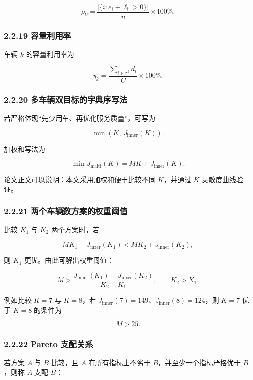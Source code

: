 \documentclass[
  a4paper,
]{ctexart}
\begin{document}
\[
\rho_V=\frac{|\{i:e_i+\ell_i>0\}|}{n}\times 100\%.
\]

\subsubsection{2.2.19 容量利用率}\label{ux5bb9ux91cfux5229ux7528ux7387}

车辆 \(k\) 的容量利用率为

\[
\eta_k=\frac{\sum_{i\in\pi^k}d_i}{C}\times 100\%.
\]

\subsubsection{2.2.20
多车辆双目标的字典序写法}\label{ux591aux8f66ux8f86ux53ccux76eeux6807ux7684ux5b57ux5178ux5e8fux5199ux6cd5}

若严格体现``先少用车、再优化服务质量''，可写为

\[
\min \left(K,\ J_{\mathrm{inner}}(K)\right).
\]

加权和写法为

\[
\min J_{\mathrm{multi}}(K)=MK+J_{\mathrm{inner}}(K).
\]

论文正文可以说明：本文采用加权和便于比较不同 \(K\)，并通过 \(K\)
灵敏度曲线验证。

\subsubsection{2.2.21
两个车辆数方案的权重阈值}\label{ux4e24ux4e2aux8f66ux8f86ux6570ux65b9ux6848ux7684ux6743ux91cdux9608ux503c}

比较 \(K_1\) 与 \(K_2\) 两个方案时，若

\[
MK_1+J_{\mathrm{inner}}(K_1)<MK_2+J_{\mathrm{inner}}(K_2),
\]

则 \(K_1\) 更优。由此可解出权重阈值：

\[
M>\frac{J_{\mathrm{inner}}(K_1)-J_{\mathrm{inner}}(K_2)}{K_2-K_1},\qquad K_2>K_1.
\]

例如比较 \(K=7\) 与 \(K=8\)，若
\(J_{\mathrm{inner}}(7)=149\)、\(J_{\mathrm{inner}}(8)=124\)，则 \(K=7\)
优于 \(K=8\) 的条件为

\[
M>25.
\]

\subsubsection{2.2.22 Pareto
支配关系}\label{pareto-ux652fux914dux5173ux7cfb}

若方案 \(A\) 与 \(B\) 比较，且 \(A\) 在所有指标上不劣于
\(B\)，并至少一个指标严格优于 \(B\)，则称 \(A\) 支配 \(B\)：
\end{document}
